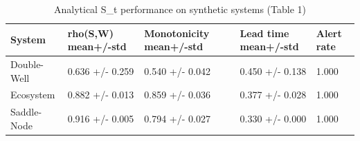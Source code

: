 \begin{table}
\caption{Analytical S_t performance on synthetic systems (Table 1)}
\label{tab:table1_synthetic_st}
\begin{tabular}{lllll}
\toprule
System & rho(S,W) mean+/-std & Monotonicity mean+/-std & Lead time mean+/-std & Alert rate \\
\midrule
Double-Well & 0.636 +/- 0.259 & 0.540 +/- 0.042 & 0.450 +/- 0.138 & 1.000 \\
Ecosystem & 0.882 +/- 0.013 & 0.859 +/- 0.036 & 0.377 +/- 0.028 & 1.000 \\
Saddle-Node & 0.916 +/- 0.005 & 0.794 +/- 0.027 & 0.330 +/- 0.000 & 1.000 \\
\bottomrule
\end{tabular}
\end{table}
